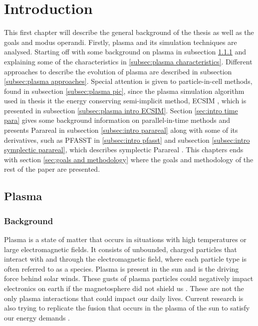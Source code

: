 \chapter{Introduction}
\label{cha:intro}
This first chapter will describe the general background of the thesis as well as the goals and modus operandi. Firstly, plasma and its simulation techniques are analysed. Starting off with some background on plasma in subsection \ref{subsec:plasma background} and explaining some of the characteristics in \ref{subsec:plasma characteristics}. Different approaches to describe the evolution of plasma are described in subsection \ref{subsec:plasma approaches}. Special attention is given to particle-in-cell methods, found in subsection \ref{subsec:plasma pic}, since the plasma simulation algorithm used in thesis it the energy conserving semi-implicit method, ECSIM \cite{lapenta_exactly_2017}, which is presented in subsection \ref{subsec:plasma intro ECSIM}. Section \ref{sec:intro time para} gives some background information on parallel-in-time methods and presents Parareal \cite{lions_resolution_2001} in subsection \ref{subsec:intro parareal} along with some of its derivatives, such as PFASST \cite{emmett_toward_2012} in \ref{subsec:intro pfasst} and subsection \ref{subsec:intro symplectic parareal}, which describes symplectic Parareal \cite{bal_symplectic_2008}. This chapters ends with section \ref{sec:goals and methodology} where the goals and methodology of the rest of the paper are presented.

\section{Plasma}
\label{sec:intro plasma}
\subsection{Background}
\label{subsec:plasma background}
Plasma is a state of matter that occurs in situations with high temperatures or large electromagnetic fields. It consists of unbounded, charged particles that interact with and through the electromagnetic field, where each particle type is often referred to as a species. Plasma is present in the sun and is the driving force behind solar winds. These gusts of plasma particles could negatively impact electronics on earth if the magnetosphere did not shield us \cite{liu_solar_2021}. These are not the only plasma interactions that could impact our daily lives. Current research is also trying to replicate the fusion that occurs in the plasma of the sun to satisfy our energy demands \cite{degrave_magnetic_2022}.  
\newline
